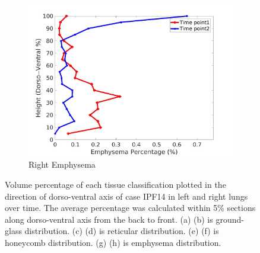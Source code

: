 \begin{figure}[H]
\begin{subfigure}{.42\linewidth}
  \includegraphics[width=\linewidth,trim={{.0\wd0} {.0\wd0} {.0\wd0} {.0\wd0}},clip]{Appendix/Image_AppexA/DorsoToVentral/IPF14RightLungEmphysemaDiseaseDorsoToVentral.jpg}
  \caption{Right Emphysema}
  \label{fig:IPF14DiseaseDorsoToVentral-h}
\end{subfigure}
\caption{Volume percentage of each tissue classification plotted in the direction of dorso-ventral axis of case IPF14 in left and right lungs over time. The average percentage was calculated within 5\% sections along dorso-ventral axis from the back to front. (a) (b) is ground-glass distribution. (c) (d) is reticular distribution. (e) (f) is honeycomb distribution. (g) (h) is emphysema distribution.}
\label{fig:IPF14DiseaseDorsoToVentral}
\end{figure}

